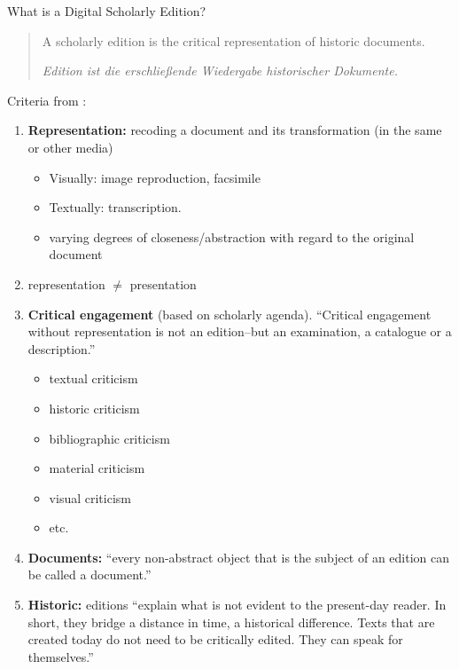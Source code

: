\begin{frame}[allowframebreaks]{What is a Digital Scholarly Edition?}
\begin{block}{\cite{sahleDigitalEdition2016}}
    \begin{quote}
        A scholarly edition is the critical representation of historic documents. %
        
        \emph{Edition ist die erschließende Wiedergabe historischer Dokumente.}
    \end{quote}
\end{block}

\framebreak 
    
Criteria from \cite{sahleDigitalEdition2016}:
    \begin{enumerate}\footnotesize
        \item \textbf{Representation:} recoding a document and its transformation (in the same or other media)
        \begin{itemize}\scriptsize
            \item Visually: image reproduction, facsimile
            \item Textually: transcription.
            \item varying degrees of closeness/abstraction with regard to the original document
        \end{itemize}
        \item representation $\neq$ presentation
        \item \textbf{Critical engagement} (based on scholarly agenda). ``Critical engagement without representation is not an edition–but an examination, a catalogue or a description.''
        \begin{itemize}\scriptsize
            \item textual criticism
            \item historic criticism
            \item bibliographic criticism
            \item material criticism
            \item visual criticism
            \item etc.
        \end{itemize}
        \item \textbf{Documents:} ``every non-abstract object that is the subject of an edition can be called a document.''
        \item \textbf{Historic:} editions ``explain what is not evident to the present-day reader. In short, they bridge a distance in time, a historical difference. Texts that are created today do not need to be critically edited. They can speak for themselves.''
    \end{enumerate}


\end{frame}
